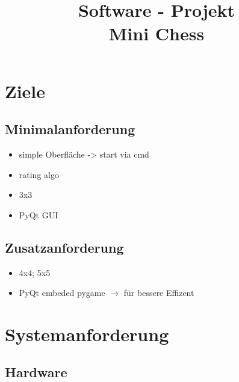 \documentclass{article}
\title{\textbf{Software - Projekt\\Mini Chess}}
\date{\vspace{-5ex}}
\begin{document}
\maketitle
\thispagestyle{fancy}


\tableofcontents
\newpage


\section{Ziele}\label{section-goals}

\subsection{Minimalanforderung}
\begin{itemize}
    \item simple Oberfläche -> start via cmd
    \item rating algo
    \item 3x3
    \item PyQt GUI
\end{itemize}

\subsection{Zusatzanforderung}
\begin{itemize}
    \item 4x4; 5x5
    \item PyQt embeded pygame $\rightarrow$ für bessere Effizent
\end{itemize}


\newpage
\section{Systemanforderung}\label{section-requirements}

\subsection{Hardware}
\end{document}
